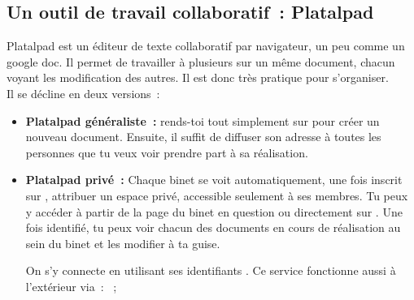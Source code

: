 \subsection{Un outil de travail collaboratif~: Platalpad}
\label{platalpad}


Platalpad est un éditeur de texte collaboratif par navigateur, un peu comme un google doc. Il permet de travailler à plusieurs sur un même document, chacun voyant les modification des autres. Il est donc très pratique pour s'organiser.\\
Il se décline en deux versions~:
\begin{itemize}

\item \textbf{Platalpad généraliste~:} rends-toi tout simplement sur  pour créer un nouveau document. Ensuite, il suffit de diffuser son adresse à toutes les personnes que tu veux voir prendre part à sa réalisation. \\

\item \textbf{Platalpad privé~:} Chaque binet se voit automatiquement, une fois inscrit sur \fkz, attribuer un espace privé, accessible seulement à ses membres. Tu peux y accéder à partir de la page \fkz du binet en question ou directement sur . Une fois identifié, tu peux voir chacun des documents en cours de réalisation au sein du binet et les modifier à ta guise.

On s'y connecte en utilisant ses identifiants \fkz. Ce service fonctionne aussi à l'extérieur via~:
~;

\end{itemize}

